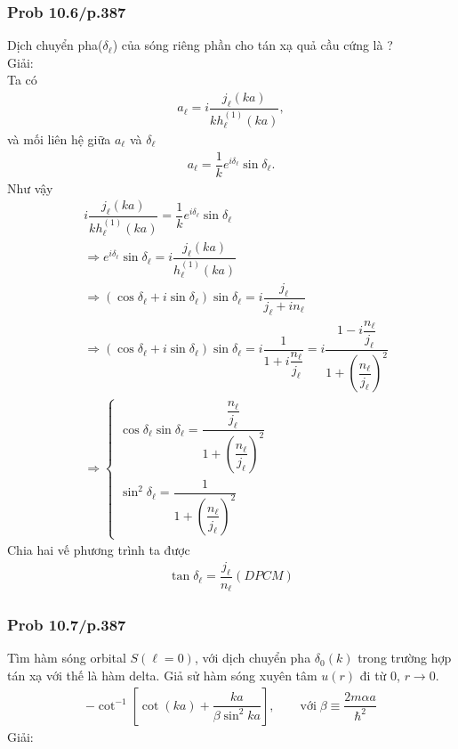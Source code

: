 \documentclass{report}
\renewcommand{\l}{\ell}
\newcommand{\f}[2]{\dfrac{#1}{#2}}
\begin{document}
\subsubsection{Prob 10.6/p.387}
Dịch chuyển pha($\delta_\l$) của sóng riêng phần cho tán xạ quả cầu cứng là ?\\
Giải:\\
Ta có
\begin{align*}
	a_{\l} = i \f{j_{\l}(ka)}{k h_{\l}^{(1)}(ka)},
\end{align*}
và mối liên hệ giữa $a_{\l}$ và $\delta_{\l}$
\begin{align*}
	a_{\l} = \f{1}{k}e^{i\delta_{\l}} \sin \delta_{\l}.
\end{align*}
Như vậy
\begin{align*}
	 & i \f{j_{\l}(ka)}{k h_{\l}^{(1)}(ka)} = \f{1}{k}e^{i\delta_{\l}} \sin \delta_{\l}                                                                                             \\
	 & \Rightarrow e^{i\delta_{\l}}\sin\delta_{\l} = i \f{j_{\l}(ka)}{h_{\l}^{(1)}(ka)}                                                                                             \\
	 & \Rightarrow (\cos\delta_{\l} + i \sin\delta_{\l}) \sin\delta_{\l} = i \f{j_{\l}}{j_{\l} + in_{\l}}                                                                           \\
	 & \Rightarrow (\cos\delta_{\l} + i \sin\delta_{\l}) \sin\delta_{\l} = i \f{1}{1 + i\f{n_{\l}}{j_{\l}}} = i \f{1 - i \f{n_{\l}}{j_{\l}}}{1 + \left(\f{n_{\l}}{j_{\l}}\right)^2} \\
	 & \Rightarrow
	\begin{cases}
		\cos\delta_{\l}\sin\delta_{\l} = \f{\f{n_{\l}}{j_{\l}}}{1 + \left(\f{n_{\l}}{j_{\l}}\right)^2} \\
		\sin^2\delta_{\l} = \f{1}{1 + \left(\f{n_{\l}}{j_{\l}}\right)^2}
	\end{cases}
\end{align*}
Chia hai vế phương trình ta được
\begin{align*}
	\tan\delta_{\l} = \f{j_{\l}}{n_{\l}} (DPCM)
\end{align*}


\subsubsection{Prob 10.7/p.387}
Tìm hàm sóng orbital $S(\l = 0)$, với dịch chuyển pha $\delta_{0}(k)$ trong trường hợp tán xạ với thế là hàm delta. Giả sử hàm sóng xuyên tâm $u(r)$ đi từ 0, $r\rightarrow 0$.
\begin{align*}
	-\cot^{-1} \left[ \cot(ka) + \f{ka}{\beta \sin^2 ka} \right], \quad \quad \text{với}\;\beta \equiv \f{2m\alpha a}{\hbar^2}
\end{align*}
Giải:\\
\end{document}
